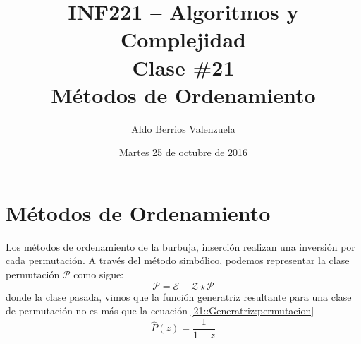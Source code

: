 \documentclass[english, spanish, fleqn, 10pt]{article}
\author{Aldo Berrios Valenzuela}
\title{INF221 -- Algoritmos y Complejidad\\[.4\baselineskip]
	Clase \#21\\
	Métodos de Ordenamiento}
\date{Martes 25 de octubre de 2016}
\numberwithin{equation}{section}
\newcommand{\nparentesis}[1]{\left( #1 \right)}
\theoremstyle{definition}
\begin{document}
\maketitle

\section{Métodos de Ordenamiento}
Los métodos de ordenamiento de la burbuja, inserción realizan una inversión por cada permutación. A través del método simbólico, podemos representar la clase permutación $\mathcal{P}$ como sigue:
\begin{equation*}
\mathcal{P} = \mathcal{E} + \mathcal{Z} \star \mathcal{P}
\end{equation*}
donde la clase pasada, vimos que la función generatriz resultante para una clase de permutación no es más que la ecuación \eqref{21::Generatriz:permutacion}
\begin{equation}\label{21::Generatriz:permutacion}
\hat P\nparentesis{z} = \dfrac{1}{1-z}
\end{equation}
\end{document}
